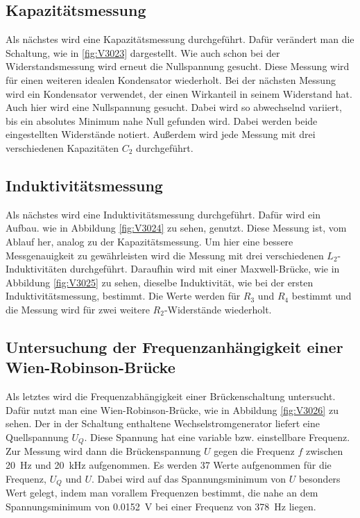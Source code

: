 \documentclass[
  bibliography=totoc,     %
  captions=tableheading,  %
  titlepage=firstiscover, %
]{scrartcl}
\begin{document}
\subsection{Kapazitätsmessung}
Als nächstes wird eine Kapazitätsmessung durchgeführt. Dafür verändert man die
Schaltung, wie in \ref{fig:V3023} dargestellt. Wie auch schon bei der
Widerstandsmessung wird erneut die Nullspannung gesucht. Diese Messung wird
für einen weiteren idealen Kondensator wiederholt. Bei der nächsten Messung wird ein Kondensator
verwendet, der einen Wirkanteil in seinem Widerstand hat. Auch hier
wird eine Nullspannung gesucht. Dabei wird so abwechselnd variiert, bis ein
absolutes Minimum nahe Null gefunden wird. Dabei werden beide eingestellten
Widerstände notiert. Außerdem wird jede Messung mit drei verschiedenen
Kapazitäten $C_2$ durchgeführt.
\newpage
\subsection{Induktivitätsmessung}
Als nächstes wird eine Induktivitätsmessung durchgeführt. Dafür wird ein Aufbau.
wie in Abbildung \ref{fig:V3024} zu sehen, genutzt. Diese Messung
ist, vom Ablauf her, analog zu der Kapazitätsmessung. Um hier eine bessere
Messgenauigkeit zu gewährleisten wird die Messung mit drei verschiedenen
$L_2$-Induktivitäten durchgeführt.
Daraufhin wird mit einer Maxwell-Brücke, wie in Abbildung \ref{fig:V3025} zu
sehen, dieselbe Induktivität, wie bei der ersten Induktivitätsmessung,
bestimmt. Die Werte werden für $R_3$ und $R_4$ bestimmt und die Messung wird
für zwei weitere $R_2$-Widerstände wiederholt.

\subsection{Untersuchung der Frequenzanhängigkeit einer Wien-Robinson-Brücke}
Als letztes wird die Frequenzabhängigkeit einer Brückenschaltung untersucht.
Dafür nutzt man eine Wien-Robinson-Brücke, wie in Abbildung \ref{fig:V3026}
zu sehen. Der in der Schaltung enthaltene Wechselstromgenerator liefert eine
Quellspannung $U_Q$. Diese Spannung hat eine variable bzw.
einstellbare Frequenz. Zur Messung wird dann die Brückenspannung $U$ gegen die
Frequenz $f$ zwischen \SI{20}{\hertz} und \SI{20}{\kilo\hertz} aufgenommen. Es
werden 37 Werte aufgenommen für die Frequenz, $U_Q$ und $U$. Dabei wird auf das
Spannungsminimum von $U$ besonders Wert gelegt, indem man vorallem Frequenzen
bestimmt, die nahe an dem Spannungsminimum von \SI{0.0152}{\volt} bei einer
Frequenz von \SI{378}{\hertz} liegen.
\newpage
\end{document}
